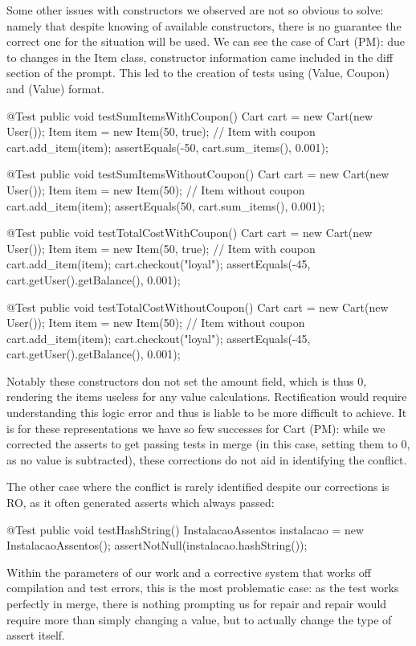 Some other issues with constructors we observed are not so obvious to solve: namely that despite knowing of available constructors, there is no guarantee
the correct one for the situation will be used. We can see the case of Cart (PM): due to changes in the Item class, constructor information came included
in the diff section of the prompt. This led to the creation of tests using (Value, Coupon) and (Value) format.
\begin{response}
    @Test
    public void testSumItemsWithCoupon() {
        Cart cart = new Cart(new User());
        Item item = new Item(50, true); // Item with coupon
        cart.add_item(item);
        assertEquals(-50, cart.sum_items(), 0.001);
    }

    @Test
    public void testSumItemsWithoutCoupon() {
        Cart cart = new Cart(new User());
        Item item = new Item(50); // Item without coupon
        cart.add_item(item);
        assertEquals(50, cart.sum_items(), 0.001);
    }

    @Test
    public void testTotalCostWithCoupon() {
        Cart cart = new Cart(new User());
        Item item = new Item(50, true); // Item with coupon
        cart.add_item(item);
        cart.checkout("loyal");
        assertEquals(-45, cart.getUser().getBalance(), 0.001);
    }

    @Test
    public void testTotalCostWithoutCoupon() {
        Cart cart = new Cart(new User());
        Item item = new Item(50); // Item without coupon
        cart.add_item(item);
        cart.checkout("loyal");
        assertEquals(-45, cart.getUser().getBalance(), 0.001);
    }
\end{response}
Notably these constructors don not set the amount field, which is thus 0, rendering the items useless for any value calculations.
Rectification would require understanding this logic error and thus is liable to be more difficult to achieve. It is for these representations
we have so few successes for Cart (PM): while we corrected the asserts to get passing tests in merge (in this case, setting them to 0, as no
value is subtracted), these corrections do not aid in identifying the conflict.

The other case where the conflict is rarely identified despite our corrections is RO, as it often generated asserts which always passed:
\begin{response}
@Test
public void testHashString() {
    InstalacaoAssentos instalacao = new InstalacaoAssentos();
    assertNotNull(instalacao.hashString());
}
\end{response}
Within the parameters of our work and a corrective system that works off compilation and test errors, this is the most problematic case: as the test works perfectly in merge,
there is nothing prompting us for repair and repair would require more than simply changing a value, but to actually change the type of assert itself.


